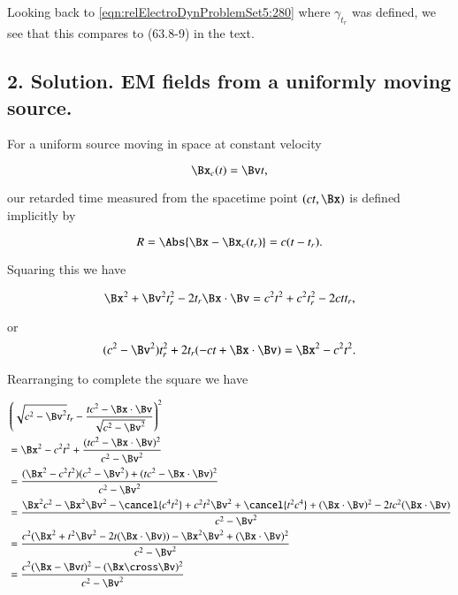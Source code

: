 Looking back to \ref{eqn:relElectroDynProblemSet5:280} where $\gamma_{t_r}$ was defined, we see that this compares to (63.8-9) in the text.

\subsection{2. Solution.  EM fields from a uniformly moving source.}

For a uniform source moving in space at constant velocity

\begin{equation}\label{eqn:relElectroDynProblemSet5:590}
\Bx_c(t) = \Bv t,
\end{equation}

our retarded time measured from the spacetime point $(ct, \Bx)$ is defined implicitly by

\begin{equation}\label{eqn:relElectroDynProblemSet5:610}
R = \Abs{\Bx - \Bx_c(t_r) } = c (t - t_r).
\end{equation}

Squaring this we have

\begin{equation}\label{eqn:relElectroDynProblemSet5:630}
\Bx^2 + \Bv^2 t_r^2 - 2 t_r \Bx \cdot \Bv = c^2 t^2 + c^2 t_r^2 - 2 c t t_r,
\end{equation}

or
\begin{equation}\label{eqn:relElectroDynProblemSet5:650}
( c^2 -\Bv^2) t_r^2 + 2 t_r ( - c t + \Bx \cdot \Bv ) = \Bx^2 - c^2 t^2.
\end{equation}

Rearranging to complete the square we have

\begin{align*}
&\left( \sqrt{c^2 - \Bv^2} t_r - \frac{ t c^2 - \Bx \cdot \Bv }{\sqrt{c^2 - \Bv^2}} \right)^2  \\
&= \Bx^2 - c^2 t^2 +\frac{ (t c^2 - \Bx \cdot \Bv)^2 }{c^2 - \Bv^2} \\
&= \frac{ (\Bx^2 - c^2 t^2)( c^2 - \Bv^2) + (t c^2 - \Bx \cdot \Bv)^2}{ c^2 - \Bv^2} \\
&= \frac{ \Bx^2 c^2 - \Bx^2 \Bv^2 - \cancel{c^4 t^2} + c^2 t^2 \Bv^2 + \cancel{t^2 c^4} + (\Bx \cdot \Bv)^2 - 2 t c^2 (\Bx \cdot \Bv) }{ c^2 - \Bv^2 } \\
&= \frac{ c^2 ( \Bx^2 + t^2 \Bv^2 -2 t (\Bx \cdot \Bv)) - \Bx^2 \Bv^2 + (\Bx \cdot \Bv)^2 }{ c^2 - \Bv^2 } \\
&= \frac{ c^2 ( \Bx - \Bv t)^2 - (\Bx \cross \Bv)^2 }{ c^2 - \Bv^2 } \\
\end{align*}


